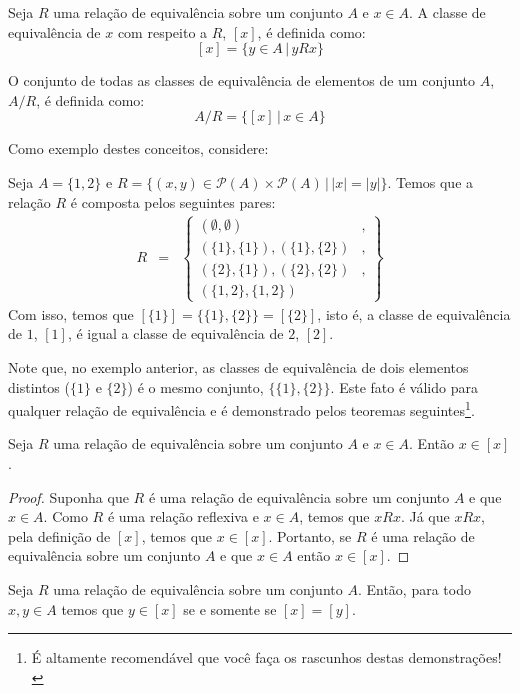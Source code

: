 \begin{Definition}
Seja $R$ uma relação de equivalência sobre um conjunto $A$ e $x \in
A$. A classe de equivalência de $x$ com respeito a $R$, $[x]$, é
definida como:
\[
[x] =\{y \in A\,|\, yRx\}
\]

O conjunto de todas as classes de equivalência de elementos de um
conjunto $A$, $A / R$, é definida como:
\[
A / R =\{[x]\,|\,x \in A\}
\]
\end{Definition}
Como exemplo destes conceitos, considere:
\begin{Example}
Seja $A =\{1,2\}$ e $R
=\{(x,y)\in\mathcal{P}(A)\times\mathcal{P}(A)\,|\,|x| = |y|\}$. Temos
que a relação $R$ é composta pelos seguintes pares:
\[
\begin{array}{lcl}
R &=&\left\{
\begin{array}{lc}
   (\emptyset,\emptyset)&,\\
   (\{1\},\{1\}),(\{1\},\{2\}) &,\\
   (\{2\},\{1\}),(\{2\},\{2\}) &,\\
   (\{1,2\},\{1,2\}) &
\end{array}
            \right\}
\end{array}
\]
Com isso, temos que $[\{1\}]=\{\{1\},\{2\}\} = [\{2\}]$, isto é, a
classe de equivalência de $1$, $[1]$, é igual a classe de equivalência
de $2$, $[2]$.
\end{Example}
Note que, no exemplo anterior, as classes de equivalência de dois
elementos distintos ($\{1\}$ e $\{2\}$) é o mesmo conjunto,
$\{\{1\},\{2\}\}$. Este fato é válido para qualquer relação de
equivalência e é demonstrado pelos teoremas seguintes\footnote{É
  altamente recomendável que você faça os rascunhos destas demonstrações!}.
\begin{Theorem}\label{eqrel1}
Seja $R$ uma relação de equivalência sobre um conjunto $A$ e $x \in
A$. Então $x \in [x]$.
\end{Theorem}
\begin{proof}
Suponha que $R$ é uma relação de equivalência sobre um conjunto $A$ e
que $x \in A$. Como $R$ é uma relação reflexiva e $x \in A$, temos que
$xRx$. Já que $xRx$, pela definição de $[x]$, temos que $x\in
[x]$. Portanto, se $R$ é uma relação de equivalência sobre um conjunto $A$ e
que $x \in A$ então $x \in [x]$.
\end{proof}
\begin{Theorem}\label{eqrel2}
Seja $R$ uma relação de equivalência sobre um conjunto $A$. Então,
para todo $x,y \in A$ temos que $y \in [x]$ se e somente se $[x] = [y]$.
\end{Theorem}
